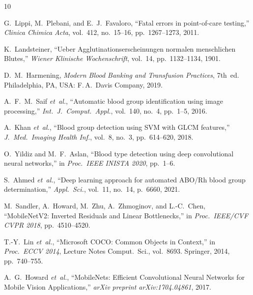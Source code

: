 \documentclass[journal]{IEEEtran}
\begin{document}
\begin{thebibliography}{10}

G.~Lippi, M.~Plebani, and E.~J.~Favaloro,
``Fatal errors in point-of-care testing,''
\emph{Clinica Chimica Acta}, vol.~412, no.~15--16,
pp.~1267--1273, 2011.

K.~Landsteiner,
``Ueber Agglutinationserscheinungen normalen menschlichen Blutes,''
\emph{Wiener Klinische Wochenschrift}, vol.~14,
pp.~1132--1134, 1901.

D.~M.~Harmening,
\emph{Modern Blood Banking and Transfusion Practices},
7th~ed. Philadelphia, PA, USA: F.\,A.~Davis Company, 2019.

A.~F.~M.~Saif \emph{et~al.},
``Automatic blood group identification using image processing,''
\emph{Int.\ J.\ Comput.\ Appl.}, vol.~140, no.~4,
pp.~1--5, 2016.

A.~Khan \emph{et~al.},
``Blood group detection using SVM with GLCM features,''
\emph{J.\ Med.\ Imaging Health Inf.}, vol.~8, no.~3,
pp.~614--620, 2018.

O.~Yildiz and M.~F.~Aslan,
``Blood type detection using deep convolutional neural networks,''
in \emph{Proc.\ IEEE INISTA 2020}, pp.~1--6.

S.~Ahmed \emph{et~al.},
``Deep learning approach for automated ABO/Rh blood group
determination,''
\emph{Appl.\ Sci.}, vol.~11, no.~14, p.~6660, 2021.

M.~Sandler, A.~Howard, M.~Zhu, A.~Zhmoginov, and L.-C.~Chen,
``MobileNetV2: Inverted Residuals and Linear Bottlenecks,''
in \emph{Proc.\ IEEE/CVF CVPR 2018}, pp.~4510--4520.

T.-Y.~Lin \emph{et~al.},
``Microsoft COCO: Common Objects in Context,''
in \emph{Proc.\ ECCV 2014}, Lecture Notes Comput.\ Sci.,
vol.~8693. Springer, 2014, pp.~740--755.

A.~G.~Howard \emph{et~al.},
``MobileNets: Efficient Convolutional Neural Networks for Mobile
Vision Applications,''
\emph{arXiv preprint arXiv:1704.04861}, 2017.

\end{thebibliography}
\end{document}
